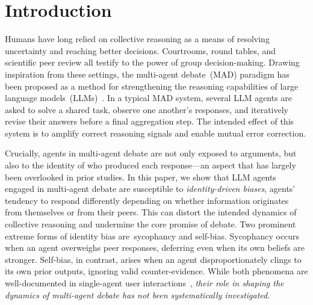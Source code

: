 \documentclass{article}
\begin{document}
\section{Introduction}

Humans have long relied on collective reasoning as a means of resolving uncertainty and reaching better decisions.  
Courtrooms, round tables, and scientific peer review all testify to the power of group decision-making.  
Drawing inspiration from these settings, the multi-agent debate~(MAD) paradigm has been proposed as a method for strengthening the reasoning capabilities of large language models~(LLMs)~\citep{chanchateval,du2024improving,bo2024reflective,li2024improving}.
In a typical MAD system, several LLM agents are asked to solve a shared task, observe one another’s responses, and iteratively revise their answers before a final aggregation step.  
The intended effect of this system is to amplify correct reasoning signals and enable mutual error correction.

Crucially, agents in multi-agent debate are not only exposed to arguments, but also to the identity of who produced each response—an aspect that has largely been overlooked in prior studies.
In this paper, we show that LLM agents engaged in multi-agent debate are susceptible to \emph{identity-driven biases}, agents’ tendency to respond differently depending on whether information originates from themselves or from their peers. This can distort the intended dynamics of collective reasoning and undermine the core promise of debate. 
Two prominent extreme forms of identity bias are~{sycophancy} and {self-bias}.  
Sycophancy occurs when an agent overweighs peer responses, deferring even when its own beliefs are stronger. Self-bias, in contrast, arises when an agent disproportionately clings to its own prior outputs, ignoring valid counter-evidence. While both phenomena are well-documented in single-agent user interactions~\citep{li2025truth,fanous2025syceval,liu2025truth,barkett2025reasoning,malmqvist2025sycophancy,hong2025measuring, spiliopoulou2025play,chen2025beyond,laurito2025ai,chen2025llm,yuan2025silencer}, \emph{their role in shaping the dynamics of multi-agent debate has not been systematically investigated}. 
\end{document}
